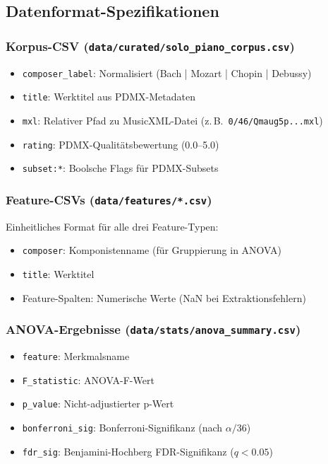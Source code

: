 \documentclass[12pt,a4paper]{article}
\theoremstyle{definition}
\begin{document}
\subsection{Datenformat-Spezifikationen}

\subsubsection{Korpus-CSV (\texttt{data/curated/solo\_piano\_corpus.csv})}
\begin{itemize}
    \item \texttt{composer\_label}: Normalisiert (Bach | Mozart | Chopin | Debussy)
    \item \texttt{title}: Werktitel aus PDMX-Metadaten
    \item \texttt{mxl}: Relativer Pfad zu MusicXML-Datei (z.\,B.\ \texttt{0/46/Qmaug5p...mxl})
    \item \texttt{rating}: PDMX-Qualitätsbewertung (0.0--5.0)
    \item \texttt{subset:*}: Boolsche Flags für PDMX-Subsets
\end{itemize}

\subsubsection{Feature-CSVs (\texttt{data/features/*.csv})}
Einheitliches Format für alle drei Feature-Typen:
\begin{itemize}
    \item \texttt{composer}: Komponistenname (für Gruppierung in ANOVA)
    \item \texttt{title}: Werktitel
    \item Feature-Spalten: Numerische Werte (NaN bei Extraktionsfehlern)
\end{itemize}

\subsubsection{ANOVA-Ergebnisse (\texttt{data/stats/anova\_summary.csv})}
\begin{itemize}
    \item \texttt{feature}: Merkmalsname
    \item \texttt{F\_statistic}: ANOVA-F-Wert
    \item \texttt{p\_value}: Nicht-adjustierter p-Wert
    \item \texttt{bonferroni\_sig}: Bonferroni-Signifikanz (nach $\alpha/36$)
    \item \texttt{fdr\_sig}: Benjamini-Hochberg FDR-Signifikanz ($q<0.05$)
\end{itemize}
\end{document}
